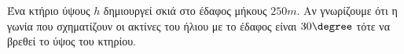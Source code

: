 Ένα κτήριο ύψους $ h $ δημιουργεί σκιά στο έδαφος μήκους $ 250m $. Αν γνωρίζουμε ότι η γωνία που σχηματίζουν οι ακτίνες του ήλιου με το έδαφος είναι $ 30\degree $ τότε να βρεθεί το ύψος του κτηρίου.

